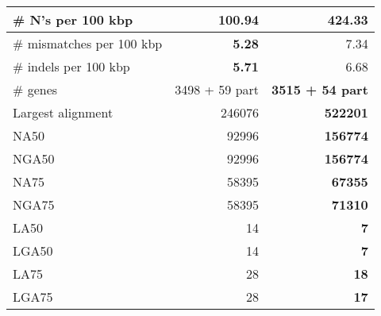 \documentclass[12pt,a4paper]{article}
\begin{document}
\begin{table}[ht]
\begin{center}
\begin{tabular}{|l*{2}{|r}|}
\# N's per 100 kbp & {\bf 100.94} & 424.33 \\ \hline
\# mismatches per 100 kbp & {\bf 5.28} & 7.34 \\ \hline
\# indels per 100 kbp & {\bf 5.71} & 6.68 \\ \hline
\# genes & 3498 + 59 part & {\bf 3515 + 54 part} \\ \hline
Largest alignment & 246076 & {\bf 522201} \\ \hline
NA50 & 92996 & {\bf 156774} \\ \hline
NGA50 & 92996 & {\bf 156774} \\ \hline
NA75 & 58395 & {\bf 67355} \\ \hline
NGA75 & 58395 & {\bf 71310} \\ \hline
LA50 & 14 & {\bf 7} \\ \hline
LGA50 & 14 & {\bf 7} \\ \hline
LA75 & 28 & {\bf 18} \\ \hline
LGA75 & 28 & {\bf 17} \\ \hline
\end{tabular}
\end{center}
\end{table}
\end{document}
